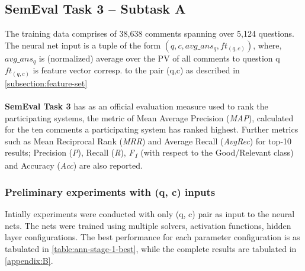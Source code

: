 \documentclass[12pt, a4paper, oneside]{Thesis} %
\begin{document}
\subsection{SemEval Task 3 -- Subtask A}

The training data comprises of 38,638 comments spanning over 5,124 questions. The neural net input is a tuple of the form $(q, c, avg\_ans_q, ft_{(q,c)})$, where, \\
\hspace*{1cm}$avg\_ans_q$ is (normalized) average over the PV of all comments to question q \\
\hspace*{1cm}$ft_{(q,c)}$ is feature vector corresp. to the pair (q,c) as described in \autoref{subsection:feature-set}
\\\\
\textbf{SemEval Task 3} has as an official evaluation measure used to rank the participating systems, the metric of Mean Average Precision (\textit{MAP}), calculated for the ten comments a participating system has ranked highest. Further metrics such as Mean Reciprocal Rank (\textit{MRR}) and Average Recall (\textit{AvgRec}) for top-10 results; Precision (\textit{P}), Recall (\textit{R}), \textit{F\textsubscript{1}} (with respect to the Good/Relevant class) and Accuracy (\textit{Acc}) are also reported.

\subsubsection{Preliminary experiments with (q, c) inputs}

Intially experiments were conducted with only (q, c) pair as input to the neural nets. The nets were trained using multiple solvers, activation functions, hidden layer configurations. The best performance for each parameter configuration is as tabulated in \autoref{table:ann-stage-1-best}, while the complete results are tabulated in \autoref{appendix:B}.
\end{document}
